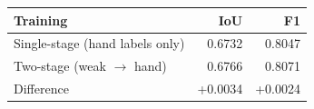 \begin{tabular}{@{}lrr@{}}
\toprule
Training & IoU & F1 \\
\midrule
Single-stage (hand labels only) & 0.6732 & 0.8047 \\
Two-stage (weak $\to$ hand) & 0.6766 & 0.8071 \\
Difference & +0.0034 & +0.0024 \\
\bottomrule
\end{tabular}
